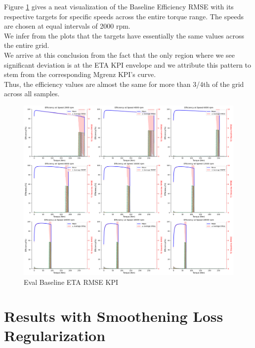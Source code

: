 \documentclass{report} %
\begin{document}
\vspace{1em} %

Figure \ref{fig:Eval Baseline ETA RMSE KPI} gives a neat visualization of the Baseline Efficiency \ac{RMSE} with its respective targets for specific speeds across the entire torque range.
The speeds are chosen at equal intervals of 2000 rpm.\\
We infer from the plots that the targets have essentially the same values across the entire grid.\\
We arrive at this conclusion from the fact that the only region where we see significant deviation is at the ETA \ac{KPI} envelope and we attribute this pattern to stem from the corresponding Mgrenz \ac{KPI}'s curve. \\
Thus, the efficiency values are almost the same for more than 3/4th of the grid across all samples.\\
\begin{figure}[H]
    \centering
    \includegraphics[width=1\textwidth]{./ReportImages/rmse_eta_Baseline.png} 
    \caption{Eval Baseline ETA \ac{RMSE} \ac{KPI}} 
    \label{fig:Eval Baseline ETA RMSE KPI}
\end{figure}

\section{Results with Smoothening Loss Regularization}\label{sec:Results with Smoothening Loss Regularization}
\end{document}
